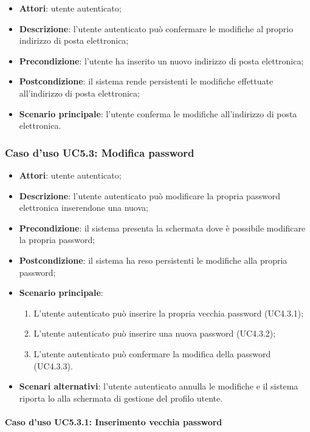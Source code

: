 \begin{itemize}
	\item \textbf{Attori}: utente autenticato;
	\item \textbf{Descrizione}: l'utente autenticato può confermare le modifiche al proprio indirizzo di posta elettronica;
	\item \textbf{Precondizione}: l'utente ha inserito un nuovo indirizzo di posta elettronica;
	\item \textbf{Postcondizione}: il sistema rende persistenti le modifiche effettuate all'indirizzo di posta elettronica;
	\item \textbf{Scenario principale}: l'utente conferma le modifiche all'indirizzo di posta elettronica.
\end{itemize}

\subsubsection{Caso d'uso UC5.3: Modifica password}

\begin{itemize}
	\item \textbf{Attori}: utente autenticato;
	\item \textbf{Descrizione}: l'utente autenticato può modificare la propria password elettronica inserendone una nuova;
	\item \textbf{Precondizione}: il sistema presenta la schermata dove è possibile modificare la propria password;
	\item \textbf{Postcondizione}: il sistema ha reso persistenti le modifiche alla propria password;
	\item \textbf{Scenario principale}:
	\begin{enumerate}
		\item L'utente autenticato può inserire la propria vecchia password (UC4.3.1);
		\item L'utente autenticato può inserire una nuova password (UC4.3.2);
		\item L'utente autenticato può confermare la modifica della password (UC4.3.3).
	\end{enumerate}
	\item \textbf{Scenari alternativi}: l'utente autenticato annulla le modifiche e il sistema riporta lo alla schermata di gestione del profilo utente.
\end{itemize}

\paragraph{Caso d'uso UC5.3.1: Inserimento vecchia password}

